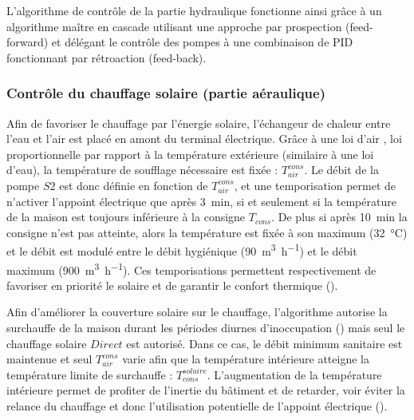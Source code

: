 L’algorithme de contrôle de la partie hydraulique fonctionne ainsi grâce à un algorithme
maître en cascade utilisant une approche par prospection (feed-forward) et délégant le
contrôle des pompes à une combinaison de PID fonctionnant par rétroaction (feed-back).

\subsubsection{Contrôle du chauffage solaire (partie aéraulique)} %
\label{ssub:controle_du_chauffage_solaire}
Afin de favoriser le chauffage par l’énergie solaire, l’échangeur de chaleur entre l’eau
et l’air est placé en amont du terminal électrique. Grâce à une loi d’air , loi
proportionnelle par rapport à la température extérieure (similaire à une loi d’eau), la
température de soufflage nécessaire est fixée : $T_{air}^{cons}$. Le débit de la pompe
$S2$ est donc définie en fonction de $T_{air}^{cons}$, et une temporisation permet de
n’activer l’appoint électrique que après \SI{3}{min}, si et seulement si la température de
la maison est toujours inférieure à la consigne $T_{cons}$. De plus si après \SI{10}{min}
la consigne n’est pas atteinte, alors la température est fixée à son maximum
(\SI{32}{\celsius}) et le débit est modulé entre le débit hygiénique
(\SI{90}{\meter\cubed\per\hour}) et le débit maximum (\SI{900}{\meter\cubed\per\hour}).
Ces temporisations permettent respectivement de favoriser en priorité le solaire et de
garantir le confort thermique ().

Afin d’améliorer la couverture solaire sur le chauffage, l’algorithme autorise la
surchauffe de la maison durant les périodes diurnes d’inoccupation ()
mais seul le chauffage solaire $Direct$ est autorisé.
Dans ce cas, le débit minimum sanitaire est maintenue et seul $T_{air}^{cons}$ varie afin
que la température intérieure atteigne la température limite de surchauffe :
$T_{cons}^{solaire}$. L’augmentation de la température intérieure permet
de profiter de l’inertie du bâtiment et de retarder, voir éviter la relance du chauffage
et donc l’utilisation potentielle de l’appoint électrique ().








